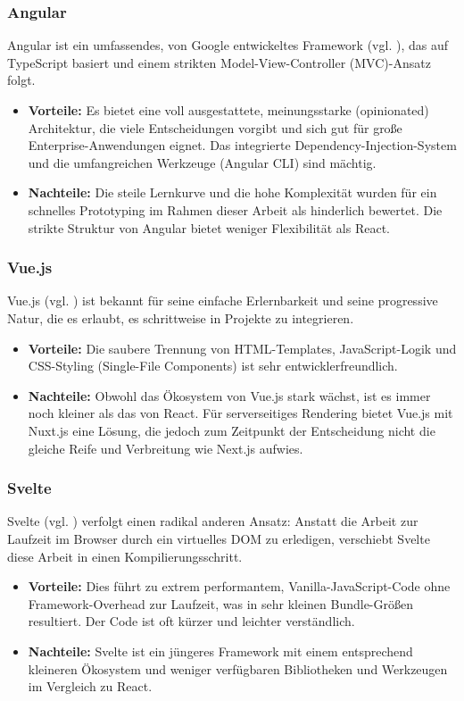 \subsubsection{Angular}
Angular ist ein umfassendes, von Google entwickeltes Framework (vgl. \cite{angular}), das auf TypeScript basiert und einem strikten Model-View-Controller (MVC)-Ansatz folgt.
\begin{itemize}
	\item \textbf{Vorteile:} Es bietet eine voll ausgestattete, meinungsstarke (opinionated) Architektur, die viele Entscheidungen vorgibt und sich gut für große Enterprise-Anwendungen eignet. Das integrierte Dependency-Injection-System und die umfangreichen Werkzeuge (Angular CLI) sind mächtig.
	\item \textbf{Nachteile:} Die steile Lernkurve und die hohe Komplexität wurden für ein schnelles Prototyping im Rahmen dieser Arbeit als hinderlich bewertet. Die strikte Struktur von Angular bietet weniger Flexibilität als React.
\end{itemize}

\subsubsection{Vue.js}
Vue.js (vgl. \cite{vuejs}) ist bekannt für seine einfache Erlernbarkeit und seine progressive Natur, die es erlaubt, es schrittweise in Projekte zu integrieren.
\begin{itemize}
	\item \textbf{Vorteile:} Die saubere Trennung von HTML-Templates, JavaScript-Logik und CSS-Styling (Single-File Components) ist sehr entwicklerfreundlich.
	\item \textbf{Nachteile:} Obwohl das Ökosystem von Vue.js stark wächst, ist es immer noch kleiner als das von React. Für serverseitiges Rendering bietet Vue.js mit Nuxt.js eine Lösung, die jedoch zum Zeitpunkt der Entscheidung nicht die gleiche Reife und Verbreitung wie Next.js aufwies.
\end{itemize}

\subsubsection{Svelte}
Svelte (vgl. \cite{svelte}) verfolgt einen radikal anderen Ansatz: Anstatt die Arbeit zur Laufzeit im Browser durch ein virtuelles DOM zu erledigen, verschiebt Svelte diese Arbeit in einen Kompilierungsschritt.
\begin{itemize}
	\item \textbf{Vorteile:} Dies führt zu extrem performantem, Vanilla-JavaScript-Code ohne Framework-Overhead zur Laufzeit, was in sehr kleinen Bundle-Größen resultiert. Der Code ist oft kürzer und leichter verständlich.
	\item \textbf{Nachteile:} Svelte ist ein jüngeres Framework mit einem entsprechend kleineren Ökosystem und weniger verfügbaren Bibliotheken und Werkzeugen im Vergleich zu React.
\end{itemize}

